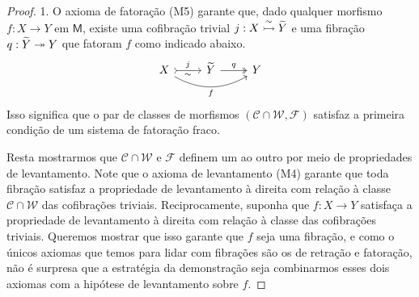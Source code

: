 \begin{proof}
  1. O axioma de fatoração (M5) garante que, dado qualquer morfismo $f: X \to Y$ em $\mathsf{M}$, existe uma cofibração trivial $j: X \overset{\sim}{\rightarrowtail} \widetilde{Y}$ e uma fibração $q: \widetilde{Y} \twoheadrightarrow Y$ que fatoram $f$ como indicado abaixo.
  \begin{displaymath}
    \begin{tikzcd}
      X
      \arrow[r, tail, "j", "\sim" {swap}]
      \arrow[rr, bend right=30, "f" swap]
      & \widetilde{Y}
      \arrow[r, two heads, "q"]
      & Y
    \end{tikzcd}
  \end{displaymath}
  Isso significa que o par de classes de morfismos $(\mathcal{C} \cap \mathcal{W}, \mathcal{F})$ satisfaz a primeira condição de um sistema de fatoração fraco.

  Resta mostrarmos que $\mathcal{C} \cap \mathcal{W}$ e $\mathcal{F}$ definem um ao outro por meio de propriedades de levantamento.
  Note que o axioma de levantamento (M4) garante que toda fibração satisfaz a propriedade de levantamento à direita com relação à classe $\mathcal{C} \cap \mathcal{W}$ das cofibrações triviais.
  Reciprocamente, suponha que $f: X \to Y$ satisfaça a propriedade de levantamento à direita com relação à classe das cofibrações triviais.
  Queremos mostrar que isso garante que $f$ seja uma fibração, e como o únicos axiomas que temos para lidar com fibrações são os de retração e fatoração, não é surpresa que a estratégia da demonstração seja combinarmos esses dois axiomas com a hipótese de levantamento sobre $f$.


\end{proof}
